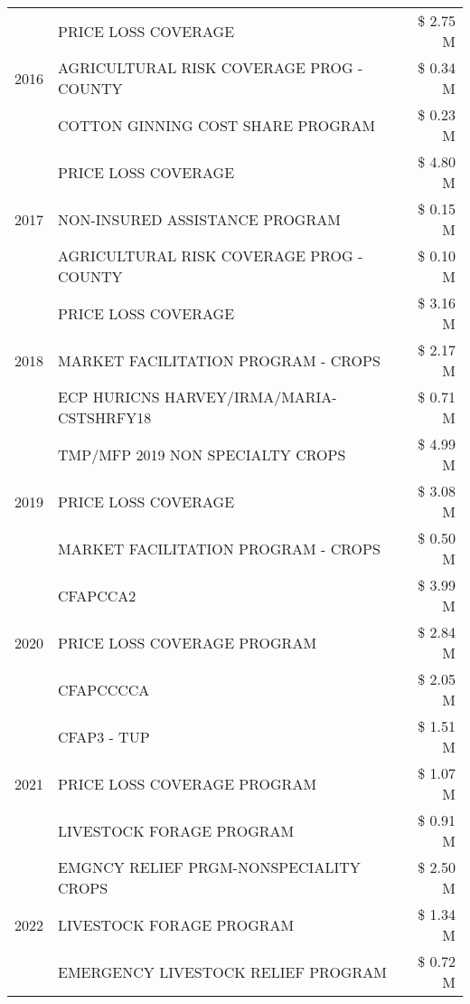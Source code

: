\begin{tabular}{llr}
\cline{1-3}
\multirow[t]{3}{*}{2016} & PRICE LOSS COVERAGE & \$ 2.75 M \\
 & AGRICULTURAL RISK COVERAGE PROG - COUNTY & \$ 0.34 M \\
 & COTTON GINNING COST SHARE PROGRAM & \$ 0.23 M \\
\cline{1-3}
\multirow[t]{3}{*}{2017} & PRICE LOSS COVERAGE & \$ 4.80 M \\
 & NON-INSURED ASSISTANCE PROGRAM & \$ 0.15 M \\
 & AGRICULTURAL RISK COVERAGE PROG - COUNTY & \$ 0.10 M \\
\cline{1-3}
\multirow[t]{3}{*}{2018} & PRICE LOSS COVERAGE & \$ 3.16 M \\
 & MARKET FACILITATION PROGRAM - CROPS & \$ 2.17 M \\
 & ECP HURICNS HARVEY/IRMA/MARIA-CSTSHRFY18 & \$ 0.71 M \\
\cline{1-3}
\multirow[t]{3}{*}{2019} & TMP/MFP 2019 NON SPECIALTY CROPS & \$ 4.99 M \\
 & PRICE LOSS COVERAGE & \$ 3.08 M \\
 & MARKET FACILITATION PROGRAM - CROPS & \$ 0.50 M \\
\cline{1-3}
\multirow[t]{3}{*}{2020} & CFAPCCA2 & \$ 3.99 M \\
 & PRICE LOSS COVERAGE PROGRAM & \$ 2.84 M \\
 & CFAPCCCCA & \$ 2.05 M \\
\cline{1-3}
\multirow[t]{3}{*}{2021} & CFAP3 - TUP & \$ 1.51 M \\
 & PRICE LOSS COVERAGE PROGRAM & \$ 1.07 M \\
 & LIVESTOCK FORAGE PROGRAM & \$ 0.91 M \\
\cline{1-3}
\multirow[t]{3}{*}{2022} & EMGNCY RELIEF PRGM-NONSPECIALITY CROPS & \$ 2.50 M \\
 & LIVESTOCK FORAGE PROGRAM & \$ 1.34 M \\
 & EMERGENCY LIVESTOCK RELIEF PROGRAM & \$ 0.72 M \\
\cline{1-3}
\bottomrule
\end{tabular}
